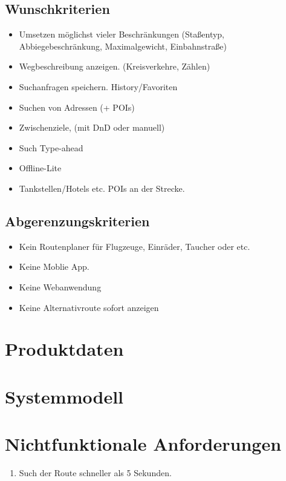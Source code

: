 \documentclass[a4paper, 11pt]{article}
\begin{document}
\subsection{Wunschkriterien}
\begin{itemize}
\item Umsetzen möglichst vieler Beschränkungen (Staßentyp, Abbiegebeschränkung, 
Maximalgewicht, Einbahnstraße)

\item Wegbeschreibung anzeigen. (Kreisverkehre, Zählen)
\item Suchanfragen speichern. History/Favoriten

\item Suchen von Adressen (+ POIs)
\item Zwischenziele, (mit DnD oder manuell)
\item Such Type-ahead
\item Offline-Lite

\item Tankstellen/Hotels etc. POIs an der Strecke.
\end{itemize}
\subsection{Abgerenzungskriterien}

\begin{itemize}
\item Kein Routenplaner für Flugzeuge, Einräder, Taucher oder etc.
\item Keine Moblie App.
\item Keine Webanwendung
\item Keine Alternativroute sofort anzeigen

\end{itemize}


\section{Produktdaten}

\section{Systemmodell}

\section{Nichtfunktionale Anforderungen}

\begin{enumerate}
\item Such der Route schneller als 5 Sekunden.

\end{enumerate}
\end{document}
